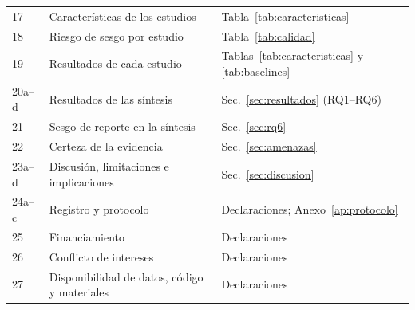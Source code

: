\documentclass[12pt, a4paper]{article}
\begin{document}
\begin{small}
\begin{longtable}{lP{8.8cm}P{4.0cm}}
17 & Caracter\'{i}sticas de los estudios & Tabla~\ref{tab:caracteristicas} \\
18 & Riesgo de sesgo por estudio & Tabla~\ref{tab:calidad} \\
19 & Resultados de cada estudio & Tablas~\ref{tab:caracteristicas} y \ref{tab:baselines} \\
20a--d & Resultados de las s\'{i}ntesis & Sec.~\ref{sec:resultados} (RQ1--RQ6) \\
21 & Sesgo de reporte en la s\'{i}ntesis & Sec.~\ref{sec:rq6} \\
22 & Certeza de la evidencia & Sec.~\ref{sec:amenazas} \\
23a--d & Discusi\'{o}n, limitaciones e implicaciones & Sec.~\ref{sec:discusion} \\
24a--c & Registro y protocolo & Declaraciones; Anexo~\ref{ap:protocolo} \\
25 & Financiamiento & Declaraciones \\
26 & Conflicto de intereses & Declaraciones \\
27 & Disponibilidad de datos, c\'{o}digo y materiales & Declaraciones \\
\end{longtable}
\end{small}
\end{document}
